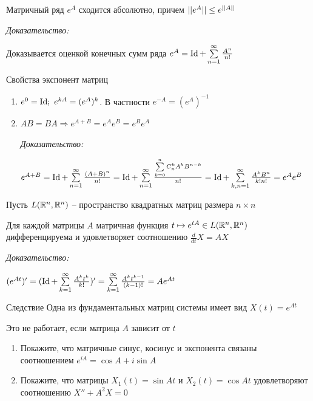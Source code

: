\documentclass[12pt]{article}
\begin{document}
\begin{lem}{}
    Матричный ряд $e^A$ сходится абсолютно, причем $|| e^A || \leq e^{|| A ||}$
\end{lem}

\textit{Доказательство:}

Доказывается оценкой конечных сумм ряда $e^A = \operatorname{Id} + \sum\limits_{n = 1}^\infty \frac{A^n}{n!}$

\begin{theo}{Свойства экспонент матриц}
    \begin{enumerate}
        \item $e^0 = \operatorname{Id};\ e^{kA} = (e^A)^k$. В частности $e^{-A} = (e^A)^{-1}$
        \item $AB = BA \Rightarrow e^{A + B} = e^Ae^B = e^Be^A$
        
        \textit{Доказательство:} 

        $e^{A + B} = \operatorname{Id} + \sum\limits_{n = 1}^\infty \frac{(A + B)^n}{n!} = \operatorname{Id} + \sum\limits_{n = 1}^\infty \frac{\sum\limits_{k = 0}^n C_n^k A^kB^{n - k}}{n!} = \operatorname{Id} + \sum\limits_{k, n = 1}^\infty \frac{A^kB^n}{k!n!} = e^Ae^B$
    \end{enumerate}
\end{theo}

\begin{nota}{}
    Пусть $L(\mathbb R^n, \mathbb R^n)$ -- пространство квадратных матриц размера $n \times n$
\end{nota}

\begin{theo}{}
    Для каждой матрицы $A$ матричная функция $t \mapsto e^{tA} \in L(\mathbb R^n, \mathbb R^n)$ дифференцируема и удовлетворяет соотношению $\frac{d}{dt}X = AX$
\end{theo}

\textit{Доказательство:}

$(e^{At})' = (\operatorname{Id} + \sum\limits_{k = 1}^\infty \frac{A^kt^k}{k!})' = \sum\limits_{k = 1}^\infty \frac{A^kt^{k - 1}}{(k - 1)!} = Ae^{At}$

\begin{theo}{Следствие}
    Одна из фундаментальных матриц системы имеет вид $X(t) = e^{At}$
\end{theo}

\begin{Remark}{}
    Это не работает, если матрица $A$ зависит от $t$
\end{Remark}

\begin{Exercise}{}
    \begin{enumerate}
        \item Покажите, что матричные синус, косинус и экспонента связаны соотношением $e^{iA} = \cos A + i \sin A$
        \item Покажите, что матрицы $X_1(t) = \sin At$ и $X_2(t) = \cos At$ удовлетворяют соотношению $X'' + A^2X = 0$
    \end{enumerate}
\end{Exercise}
\end{document}
